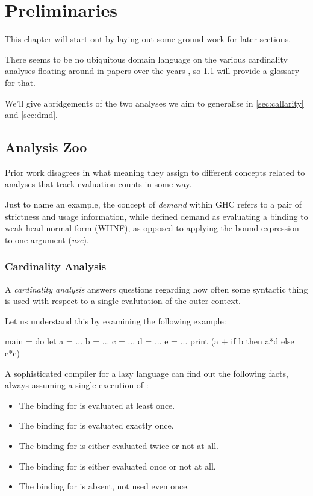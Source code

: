 \chapter{Preliminaries}\label{sec:prel}

This chapter will start out by laying out some ground work for later sections.

There seems to be no ubiquitous domain language on the various cardinality analyses floating around in papers over the years \parencite{projimpl,verstoepthesis,sestoft,sharing,updabs,callarity,warnsbrough,dmd,card}, so \cref{sec:zoo} will provide a glossary for that.

We'll give abridgements of the two analyses we aim to generalise in \cref{sec:callarity} and \cref{sec:dmd}.

\section{Analysis Zoo}\label{sec:zoo}

Prior work disagrees in what meaning they assign to different concepts related to analyses that track evaluation counts in some way.

Just to name an example, the concept of \emph{demand} within GHC refers to a pair of strictness and usage information, while \textcite[appendix~C.2]{warnsbrough} defined demand as evaluating a binding to weak head normal form (WHNF), as opposed to applying the bound expression to one argument (\emph{use}).

\subsection{Cardinality Analysis}\label{sec:card}

A \emph{cardinality analysis} answers questions regarding how often some syntactic thing is used with respect to a single evalutation of the outer context.

Let us understand this by examining the following example:

\begin{haskellcode}
  main = do
    let a = ...
        b = ...
        c = ...
        d = ...
        e = ...
    print (a + if b then a*d else c*c)
\end{haskellcode}

A sophisticated compiler for a lazy language can find out the following facts, always assuming a single execution of :
\begin{itemize}
  \item The binding for  is evaluated at least once.
  \item The binding for  is evaluated exactly once.
  \item The binding for  is either evaluated twice or not at all.
  \item The binding for  is either evaluated once or not at all.
  \item The binding for  is absent, \eg not used even once.
\end{itemize}

